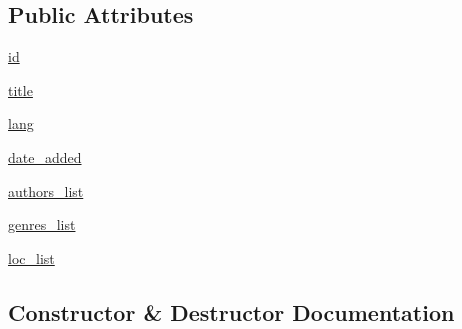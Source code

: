 \subsection*{Public Attributes}
\begin{DoxyCompactItemize}
\item 
\hyperlink{classbridges_1_1data__src__dependent_1_1gutenberg__meta_1_1_gutenberg_meta_a8d3429925e3bda303e672b32e5728412}{id}
\item 
\hyperlink{classbridges_1_1data__src__dependent_1_1gutenberg__meta_1_1_gutenberg_meta_ab153eefa0661fa6f355045956166a4bf}{title}
\item 
\hyperlink{classbridges_1_1data__src__dependent_1_1gutenberg__meta_1_1_gutenberg_meta_a2176ec26191cf831c5475a29a30d634e}{lang}
\item 
\hyperlink{classbridges_1_1data__src__dependent_1_1gutenberg__meta_1_1_gutenberg_meta_af0b6cef7f9b2067fa9a8b4465b3b17d5}{date\+\_\+added}
\item 
\hyperlink{classbridges_1_1data__src__dependent_1_1gutenberg__meta_1_1_gutenberg_meta_a1a8783b93632477a7957d48018060b49}{authors\+\_\+list}
\item 
\hyperlink{classbridges_1_1data__src__dependent_1_1gutenberg__meta_1_1_gutenberg_meta_af16111cba71b3cf8fdd31a431ace4888}{genres\+\_\+list}
\item 
\hyperlink{classbridges_1_1data__src__dependent_1_1gutenberg__meta_1_1_gutenberg_meta_a6942d4258deaa3c4305ca542bb2fc626}{loc\+\_\+list}
\end{DoxyCompactItemize}


\subsection{Constructor \& Destructor Documentation}
\mbox{\label{classbridges_1_1data__src__dependent_1_1gutenberg__meta_1_1_gutenberg_meta_ab3bf80ac6dedbf60329e2a1e879b2045}} 
